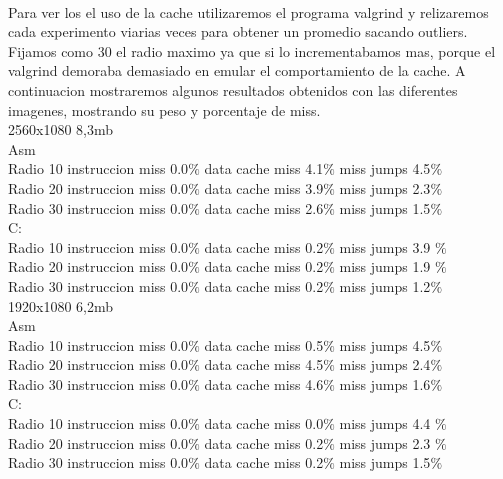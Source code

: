 \\
Para ver los el uso de la cache utilizaremos el programa valgrind y relizaremos cada experimento viarias veces para obtener un promedio sacando outliers. Fijamos como 30 el radio maximo ya que si lo incrementabamos mas, porque el  valgrind demoraba demasiado en emular el comportamiento de la cache. A continuacion mostraremos algunos resultados obtenidos con las diferentes imagenes, mostrando su peso y porcentaje de miss. \\

2560x1080 8,3mb \\

Asm \\
	Radio 10   instruccion miss   0.0$\%$  data cache miss  4.1$\%$ miss jumps   4.5$\%$ \\
	Radio 20   instruccion miss   0.0$\%$  data cache miss  3.9$\%$ miss jumps   2.3$\%$ \\	
	Radio 30   instruccion miss   0.0$\%$  data cache miss  2.6$\%$ miss jumps   1.5$\%$ \\

C: \\
	Radio 10  instruccion miss  0.0$\%$  data cache miss 0.2$\%$ miss jumps  3.9 $\%$  \\
	Radio 20  instruccion miss  0.0$\%$  data cache miss 0.2$\%$ miss jumps   1.9 $\%$  \\
	Radio 30  instruccion miss  0.0$\%$  data cache miss 0.2$\%$ miss jumps   1.2$\%$  \\ 

1920x1080 6,2mb \\

Asm \\
	Radio 10   instruccion miss   0.0$\%$  data cache miss  0.5$\%$ miss jumps   4.5$\%$ \\
	Radio 20   instruccion miss   0.0$\%$  data cache miss  4.5$\%$ miss jumps   2.4$\%$ \\	
	Radio 30   instruccion miss   0.0$\%$  data cache miss  4.6$\%$ miss jumps   1.6$\%$ \\

C: \\
	Radio 10  instruccion miss  0.0$\%$  data cache miss 0.0$\%$ miss jumps  4.4 $\%$  \\
	Radio 20  instruccion miss  0.0$\%$  data cache miss 0.2$\%$ miss jumps   2.3 $\%$  \\
	Radio 30  instruccion miss  0.0$\%$  data cache miss 0.2$\%$ miss jumps   1.5$\%$  \\ 

